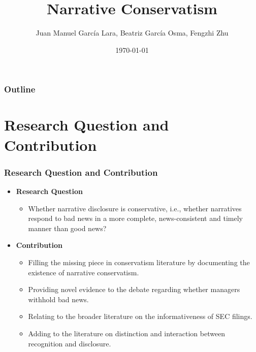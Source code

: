 \documentclass{beamer}
\title[Narrative Conservatism]{Narrative Conservatism} %
\author[]{Juan Manuel Garc\'ia Lara, Beatriz Garc\'ia Osma, Fengzhi Zhu} %
\institute[] %
{Universidad Carlos III de Madrid \\ %

	\medskip
	fzhu@emp.uc3m.es} %
\date{\today} %
\begin{document}
	
\begin{frame}
\titlepage %
\end{frame}

\begin{frame}
\frametitle{Outline}
\tableofcontents
\end{frame}

\section{Research Question and Contribution}

\begin{frame}
\frametitle{Research Question and Contribution}
\begin{itemize}
\item \textbf{Research Question}

\begin{itemize}
\item Whether narrative disclosure is conservative, i.e., whether narratives respond to bad news in a more complete, news-consistent and timely manner than good news?
\end{itemize}

\item \textbf{Contribution}

\begin{itemize}
	\item Filling the missing piece in conservatism literature by documenting the existence of narrative conservatism.
	\item Providing novel evidence to the debate regarding whether managers withhold bad news. 
	\item Relating to the broader literature on the informativeness of SEC filings.
	\item Adding to the literature on distinction and interaction between recognition and disclosure.
\end{itemize}
\end{itemize}
\end{frame}
\end{document}
